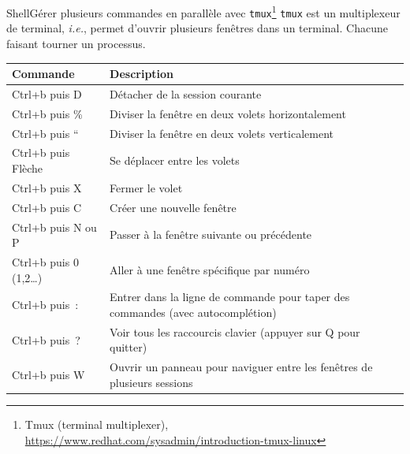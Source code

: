 \documentclass{beamer}
\begin{document}
    \begin{frame}{Shell}{Gérer plusieurs commandes en parallèle avec \lstinline{tmux}\footnote{\label{itm:tmux}Tmux (terminal multiplexer), \url{https://www.redhat.com/sysadmin/introduction-tmux-linux}}}
        \lstinline{tmux} est un multiplexeur de terminal, \textit{i.e.}, permet d'ouvrir plusieurs fenêtres dans un terminal.
        Chacune faisant tourner un processus.
        \begin{footnotesize}
            \begin{table}[ht]
                \begin{tabular}{|p{3.5cm}|p{8cm}|}
                    \hline
                    \textbf{Commande}         & \textbf{Description}                                                            \\
                    \hline
                    Ctrl+b puis D             & Détacher de la session courante                                                 \\
                    \hline
                    Ctrl+b puis \%            & Diviser la fenêtre en deux volets horizontalement                               \\
                    \hline
                    Ctrl+b puis ``            & Diviser la fenêtre en deux volets verticalement                                 \\
                    \hline
                    Ctrl+b puis Flèche        & Se déplacer entre les volets                                                    \\
                    \hline
                    Ctrl+b puis X             & Fermer le volet                                                                 \\
                    \hline
                    Ctrl+b puis C             & Créer une nouvelle fenêtre                                                      \\
                    \hline
                    Ctrl+b puis N ou P        & Passer à la fenêtre suivante ou précédente                                      \\
                    \hline
                    Ctrl+b puis 0 (1,2\ldots) & Aller à une fenêtre spécifique par numéro                                       \\
                    \hline
                    Ctrl+b puis~:             & Entrer dans la ligne de commande pour taper des commandes (avec autocomplétion) \\
                    \hline
                    Ctrl+b puis~?             & Voir tous les raccourcis clavier (appuyer sur Q pour quitter)                   \\
                    \hline
                    Ctrl+b puis W             & Ouvrir un panneau pour naviguer entre les fenêtres de plusieurs sessions        \\
                    \hline
                \end{tabular}
            \end{table}
        \end{footnotesize}
    \end{frame}
\end{document}
